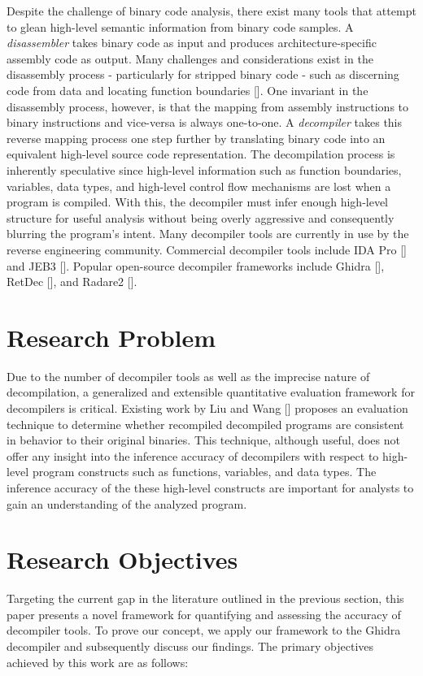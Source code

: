 Despite the challenge of binary code analysis, there exist many tools that attempt to glean high-level semantic information from binary code samples. A \emph{disassembler} takes binary code as input and produces architecture-specific assembly code as output. Many challenges and considerations exist in the disassembly process - particularly for stripped binary code - such as discerning code from data and locating function boundaries []. One invariant in the disassembly process, however, is that the mapping from assembly instructions to binary instructions and vice-versa is always one-to-one. A \emph{decompiler} takes this reverse mapping process one step further by translating binary code into an equivalent high-level source code representation. The decompilation process is inherently speculative since high-level information such as function boundaries, variables, data types, and high-level control flow mechanisms are lost when a program is compiled. With this, the decompiler must infer enough high-level structure for useful analysis without being overly aggressive and consequently blurring the program's intent. Many decompiler tools are currently in use by the reverse engineering community. Commercial decompiler tools include IDA Pro [] and JEB3 []. Popular open-source decompiler frameworks include Ghidra [], RetDec [], and Radare2 [].

\section{Research Problem}

Due to the number of decompiler tools as well as the imprecise nature of decompilation, a generalized and extensible quantitative evaluation framework for decompilers is critical. Existing work by Liu and Wang [] proposes an evaluation technique to determine whether recompiled decompiled programs are consistent in behavior to their original binaries. This technique, although useful, does not offer any insight into the inference accuracy of decompilers with respect to high-level program constructs such as functions, variables, and data types. The inference accuracy of the these high-level constructs are important for analysts to gain an understanding of the analyzed program.

\section{Research Objectives}

Targeting the current gap in the literature outlined in the previous section, this paper presents a novel framework for quantifying and assessing the accuracy of decompiler tools. To prove our concept, we apply our framework to the Ghidra decompiler and subsequently discuss our findings. The primary objectives achieved by this work are as follows:

